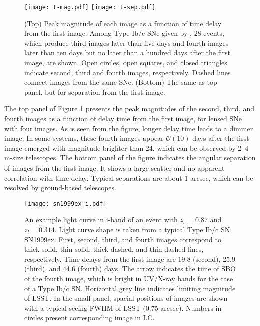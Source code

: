 \documentclass[useAMS,usenatbib,twocolumn]{mnras}
\begin{document}
\begin{figure}
\centering
\texttt{[image: t-mag.pdf]}
\texttt{[image: t-sep.pdf]}
\caption{ (Top) Peak magnitude of each image as a function of time
  delay from the first image. Among Type Ib/c SNe given by
  \citet{ogur10}, 28 events, which produce third images later than
  five days and fourth images later than ten days but no later than a
  hundred days after the first image, are shown. Open circles, open
  squares, and closed triangles indicate second, third and fourth
  images, respectively. Dashed lines connect images from the same SNe.
  (Bottom) The same as top panel, but for separation from the first
  image.}
\label{fig:t-mag}
\end{figure}

The top panel of Figure \ref{fig:t-mag} presents the peak magnitudes
of the second, third, and fourth images as a function of delay time
from the first image, for lensed SNe with four images. As is seen from
the figure, longer delay time leads to a dimmer image.  In some
systems, these fourth images appear $\mathcal{O}(10)$ days after the
first image emerged with magnitude brighter than 24, which can be
observed by 2--4 m-size telescopes. The bottom panel of the figure
indicates the angular separation of images from the first image. It
shows a large scatter and no apparent correlation with time
delay. Typical separations are about 1 arcsec, which can be resolved
by ground-based telescopes.

\begin{figure}
\centering
\texttt{[image: sn1999ex\_i.pdf]}
\caption{An example light curve in i-band of an event with $z_s=0.87$
  and $z_l=0.314$. Light curve shape is taken from a typical Type Ib/c
  SN, SN1999ex. First, second, third, and fourth images correspond to
  thick-solid, thin-solid, thick-dashed, and thin-dashed lines,
  respectively. Time delays from the first image are 19.8 (second),
  25.9 (third), and 44.6 (fourth) days.  The arrow indicates the time
  of SBO of the fourth image, which is bright in UV/X-ray bands for
  the case of a Type Ib/c SN. Horizontal grey line indicates limiting
  magnitude of LSST.
%
  In the small panel, spacial positions of images are shown with a
  typical seeing FWHM of LSST (0.75 arcsec). Numbers in circles
  present corresponding image in LC.  }
\label{fig:sn1999ex}
\end{figure}
\end{document}
